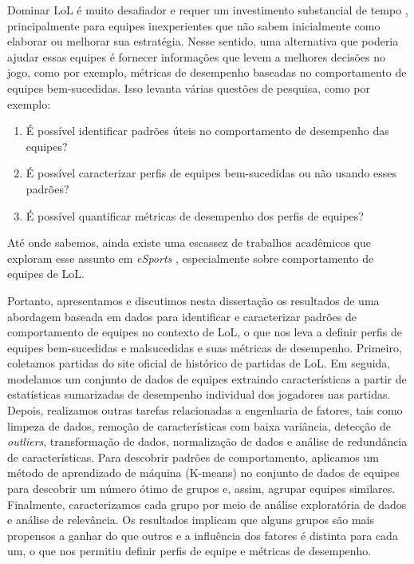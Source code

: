 Dominar LoL é muito desafiador e requer um investimento substancial de tempo \cite{drachen2014skill}, principalmente para equipes inexperientes que não sabem inicialmente como elaborar ou melhorar sua estratégia. Nesse sentido, uma alternativa que poderia ajudar essas equipes é fornecer informações que levem a melhores decisões no jogo, como por exemplo, métricas de desempenho baseadas no comportamento de equipes bem-sucedidas. Isso levanta várias questões de pesquisa, como por exemplo:

\begin{enumerate}[label=(\roman*)]
  \item É possível identificar padrões úteis no comportamento de desempenho das equipes?
  \item É possível caracterizar perfis de equipes bem-sucedidas ou não usando esses padrões?
  \item É possível quantificar métricas de desempenho dos perfis de equipes?
\end{enumerate}

Até onde sabemos, ainda existe uma escassez de trabalhos acadêmicos que exploram esse assunto em \textit{eSports} \cite{drachen2014skill} \cite{ong2015player}, especialmente sobre comportamento de equipes de LoL.

Portanto, apresentamos e discutimos nesta dissertação os resultados de uma abordagem baseada em dados para identificar e caracterizar padrões de comportamento de equipes no contexto de LoL, o que nos leva a definir perfis de equipes bem-sucedidas e malsucedidas e suas métricas de desempenho. Primeiro, coletamos partidas do site oficial de histórico de partidas de LoL. Em seguida, modelamos um conjunto de dados de equipes extraindo características a partir de estatísticas sumarizadas de desempenho individual dos jogadores nas partidas. Depois, realizamos outras tarefas relacionadas a engenharia de fatores, tais como limpeza de dados, remoção de características com baixa variância, detecção de \textit{outliers}, transformação de dados, normalização de dados e análise de redundância de características. Para descobrir padrões de comportamento, aplicamos um método de aprendizado de máquina (K-means) no conjunto de dados de equipes para descobrir um número ótimo de grupos e, assim, agrupar equipes similares. Finalmente, caracterizamos cada grupo por meio de análise exploratória de dados e análise de relevância. Os resultados implicam que alguns grupos são mais propensos a ganhar do que outros e a influência dos fatores é distinta para cada um, o que nos permitiu definir perfis de equipe e métricas de desempenho.

